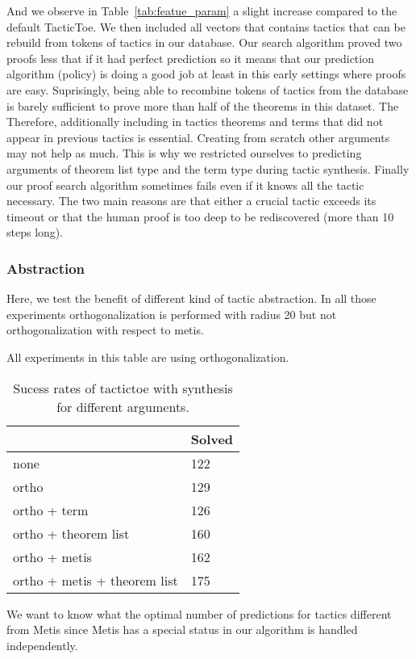 \documentclass[runningheads,a4paper,draft]{svjour3}
\def\metis{\textsf{Metis}\xspace}
\def\tactictoe{\textsf{TacticToe}\xspace}
\newcommand{\ra}[1]{\renewcommand{\arraystretch}{#1}}
\begin{document}
And we observe in Table~\ref{tab:featue_param} a 
slight increase compared to the default \tactictoe. We then included all 
vectors that contains tactics that can be rebuild from tokens of
tactics in our database. 
Our search algorithm proved two proofs less that if it had perfect prediction 
so it means that our prediction algorithm (policy) is doing a good  job at 
least in this early settings where proofs are easy. 
Suprisingly, being able to recombine tokens of tactics from the database is 
barely sufficient to prove more than half of the theorems in this dataset. The 
Therefore, additionally including in tactics theorems and terms that did not 
appear in previous tactics is essential. Creating from scratch other arguments 
may not help as much. This is why we restricted ourselves to predicting 
arguments of theorem list type and the term type during tactic synthesis. 
Finally our proof search algorithm sometimes fails even if it knows all the 
tactic necessary. The two main reasons are that either a crucial tactic exceeds 
its timeout or that the human proof is too deep to be rediscovered (more than 
10 steps long).

\subsubsection{Abstraction}
Here, we test the benefit of different kind of tactic abstraction. 
In all those experiments orthogonalization is performed with radius 20 but not 
orthogonalization with respect to metis.


All experiments in this table are using orthogonalization.
\begin{table}[t]
\centering\ra{1.3}
\small
\begin{tabular}{ll}
\toprule
  & Solved \\
\midrule
 none & 122\\
 ortho & 129\\
 ortho + term & 126\\    
 ortho + theorem list & 160\\
 ortho + metis & 162\\
 ortho + metis + theorem list & 175\\ 
\bottomrule
\end{tabular}
\caption{\label{tab:cfot_param}
Sucess rates of tactictoe with synthesis for different arguments.}
\end{table}
We want to know what the optimal number of predictions for tactics different 
from \metis since \metis has a special status in our algorithm is handled 
independently.
\end{document}
